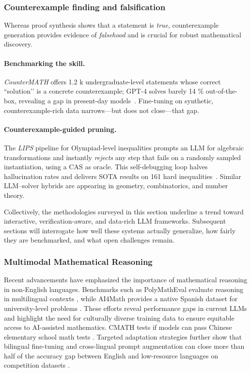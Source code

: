\documentclass[acmsmall,anonymous]{acmart}
\begin{document}
\subsubsection{Counterexample finding and falsification}
\label{subsec:counterexamples}
Whereas proof synthesis shows that a statement is \emph{true},
counterexample generation provides evidence of \emph{falsehood} and is
crucial for robust mathematical discovery.

\paragraph{Benchmarking the skill.}
\emph{CounterMATH} offers 1.2 k undergraduate-level statements whose
correct “solution’’ is a concrete counterexample; GPT-4 solves barely
14 \% out-of-the-box, revealing a gap in present-day
models~\cite{li2025countermath}. Fine-tuning on synthetic,
counterexample-rich data narrows—but does not close—that gap.

\paragraph{Counterexample-guided pruning.}
The \emph{LIPS} pipeline for Olympiad-level inequalities prompts an LLM
for algebraic transformations and instantly \emph{rejects} any step that
fails on a randomly sampled instantiation, using a CAS as oracle. This
self-debugging loop halves hallucination rates and delivers SOTA results
on 161 hard inequalities~\cite{li2025lips}. Similar LLM–solver hybrids
are appearing in geometry, combinatorics, and number theory.


\bigskip
Collectively, the methodologies surveyed in this section underline a trend toward interactive, verification-aware, and data-rich LLM frameworks.  Subsequent sections will interrogate how well these systems actually generalize, how fairly they are benchmarked, and what open challenges remain.

\subsubsection{Multimodal Mathematical Reasoning}\label{sec:multilingual}
Recent advancements have emphasized the importance of mathematical reasoning in non-English languages. Benchmarks such as PolyMathEval evaluate reasoning in multilingual contexts \cite{anonymous2025polymatheval,anonymous2025polymatheval}, while AI4Math provides a native Spanish dataset for university-level problems \cite{perez2025ai4mathnativespanishbenchmark}. These efforts reveal performance gaps in current LLMs and highlight the need for culturally diverse training data to ensure equitable access to AI-assisted mathematics. CMATH tests if models can pass Chinese elementary school math tests \cite{wei2023cmath}. Targeted adaptation strategies further show that bilingual fine-tuning and cross-lingual prompt augmentation can close more than half of the accuracy gap between English and low-resource languages on competition datasets \cite{chen-2024-multilingual-math}.
\end{document}
